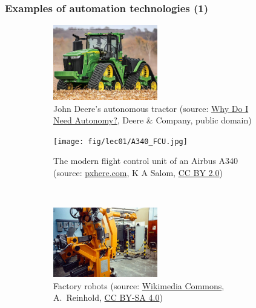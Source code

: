 \begin{frame}
	\frametitle{Examples of automation technologies (1)}
	\begin{figure}
		\centering
		\begin{subfigure}[b]{0.49\textwidth}
			\centering
			\includegraphics[width=0.5\textwidth]{fig/lec01/Tractor.png}
			\caption{John Deere's autonomous tractor (source: \href{https://www.deere.ca/assets/images/common/autonomous-r4i016906-r1-tractor-876x630.jpg}{Why Do I Need Autonomy?},  Deere \& Company, public domain)}
		\end{subfigure}
		\hfill
		\begin{subfigure}[b]{0.49\textwidth}
			\centering
			\texttt{[image: fig/lec01/A340\_FCU.jpg]}
			\caption{The modern flight control unit of an Airbus A340 (source: \href{https://pxhere.com/en/photo/954757}{pxhere.com}, K A Salom, \href{https://creativecommons.org/licenses/by/2.0}{CC BY 2.0})}
		\end{subfigure}
		\\ 
		\vspace{-0.25cm}
		\begin{subfigure}[b]{0.49\textwidth}
			\centering
			\includegraphics[width=0.5\textwidth]{fig/lec01/Automatix_KukaRobot.jpg}
			\caption{Factory robots (source: \href{https://commons.wikimedia.org/wiki/File:Automatix_KukaRobot483.agr.jpg}{Wikimedia Commons}, A.~Reinhold, \href{https://creativecommons.org/licenses/by-sa/4.0/deed.en}{CC BY-SA 4.0})}
		\end{subfigure}
		\hfill
		\begin{subfigure}[b]{0.49\textwidth}
			\centering

\end{subfigure}
\end{figure}
\end{frame}
